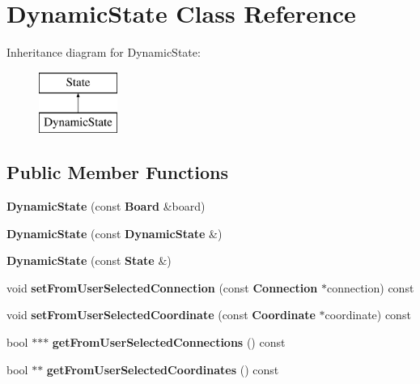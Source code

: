 \section{Dynamic\-State Class Reference}
\label{class_dynamic_state}
Inheritance diagram for Dynamic\-State\-:\begin{figure}[H]
\begin{center}
\leavevmode
\includegraphics[height=2.000000cm]{class_dynamic_state}
\end{center}
\end{figure}
\subsection*{Public Member Functions}
\begin{DoxyCompactItemize}
\item 
{\bfseries Dynamic\-State} (const {\bf Board} \&board)\label{class_dynamic_state_a888844762663eb09cfde480c669213b4}

\item 
{\bfseries Dynamic\-State} (const {\bf Dynamic\-State} \&)\label{class_dynamic_state_a941655a6f314688d8da1dcb6167c5495}

\item 
{\bfseries Dynamic\-State} (const {\bf State} \&)\label{class_dynamic_state_a52689262e2d4c9a1645f5328fe655284}

\item 
void {\bfseries set\-From\-User\-Selected\-Connection} (const {\bf Connection} $\ast$connection) const \label{class_dynamic_state_ac39cd29a7408106b7159ddfc33b5b2b2}

\item 
void {\bfseries set\-From\-User\-Selected\-Coordinate} (const {\bf Coordinate} $\ast$coordinate) const \label{class_dynamic_state_aca5372346b67191e138c1646ff29fb2c}

\item 
bool $\ast$$\ast$$\ast$ {\bfseries get\-From\-User\-Selected\-Connections} () const \label{class_dynamic_state_a860354c9d7f5169de7a2f9791547a836}

\item 
bool $\ast$$\ast$ {\bfseries get\-From\-User\-Selected\-Coordinates} () const \label{class_dynamic_state_adc4972ab0db0da64f36e93fbd22da86a}

\end{DoxyCompactItemize}
